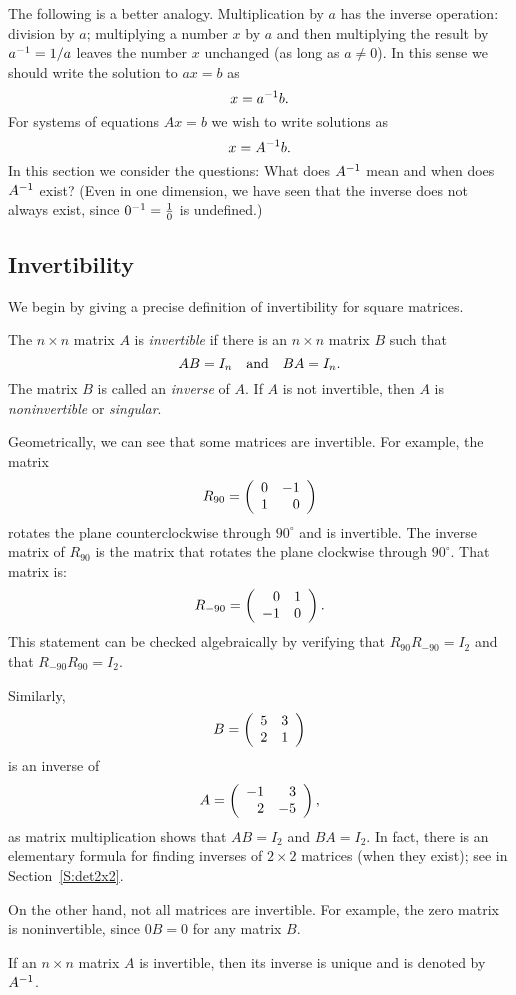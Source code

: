 The following is a better analogy.  Multiplication by $a$ has the
inverse operation: division by $a$; multiplying a number $x$ by
$a$ and then multiplying the result by $a^{-1}=1/a$ leaves the number
$x$ unchanged (as long as $a\neq 0$).  In this sense we should
write the solution to $ax=b$ as
\[
x=a^{-1} b.
\]
For systems of equations $Ax=b$ we wish to write solutions as
\[
x=A^{-1} b.
\]
In this section we consider the questions: What does $A^{-1}$
mean and when does $A^{-1}$ exist? (Even in one dimension, we
have seen that the inverse does not always exist, since
$0^{-1}=\frac{1}{0}$ is undefined.)

\subsection*{Invertibility}

We begin by giving a precise definition of invertibility for square matrices.
\begin{Def} \label{inverse}  
The $n\times n$ matrix $A$ is {\em invertible\/} if there is an $n\times n$
matrix $B$ such that
\[
AB=I_n \quad\mbox{and}\quad BA=I_n.
\]
The matrix $B$ is called an {\em inverse\/} of $A$.  If $A$ is not invertible,
then $A$ is {\em noninvertible\/} or {\em singular\/}. 
\end{Def}

Geometrically, we can see that some matrices are invertible.  For example, 
the matrix
\[
R_{90} = \left(\begin{array}{rr} 0 & -1\\ 1 &0\end{array}\right)
\]
rotates the plane counterclockwise through $90^\circ$ and is
invertible.  The inverse matrix of $R_{90}$ is the matrix that rotates the
plane clockwise through $90^\circ$.  That matrix is:
\[
R_{-90} = \left(\begin{array}{rr} 0 & 1\\ -1 &0\end{array}\right).
\]
This statement can be checked algebraically by verifying that 
$R_{90}R_{-90}=I_2$ and that $R_{-90}R_{90} = I_2$.

Similarly,  
\[
B = \left(\begin{array}{rr} 5 & 3\\ 2 &1\end{array}\right)
\]
is an inverse of 
\[
A = \left(\begin{array}{rr} -1 & 3\\ 2 &-5\end{array}\right),
\]
as matrix multiplication shows that $AB=I_2$ and $BA=I_2$. In fact, there is 
an elementary formula for finding inverses of $2\times 2$ matrices (when they 
exist); see  in Section~\ref{S:det2x2}.

On the other hand, not all matrices are invertible.  For example, the zero 
matrix is noninvertible, since $0B=0$ for any matrix $B$.

\begin{lemma} \label{B=C}
If an $n\times n$ matrix $A$ is invertible, then its inverse is unique
and is denoted by $A^{-1}$.
\end{lemma}

